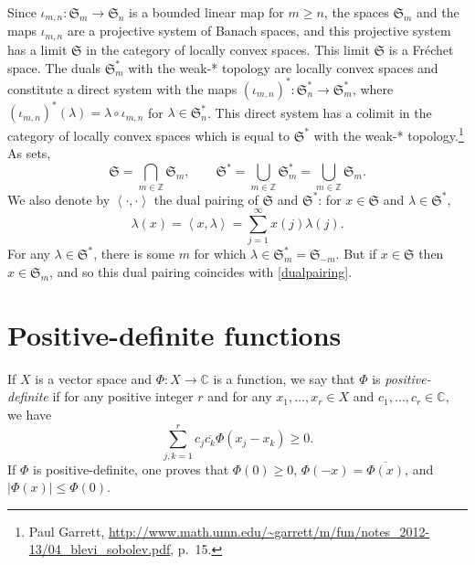 \documentclass{article}
\newcommand{\inner}[2]{\left\langle #1, #2 \right\rangle}
\theoremstyle{definition}
\theoremstyle{definition}
\begin{document}
Since $\iota_{m,n}:\mathfrak{S}_m \to \mathfrak{S}_n$ is a bounded linear map for $m \geq n$, 
the spaces $\mathfrak{S}_m$ and the maps $\iota_{m,n}$ are a projective system of Banach spaces, and this projective system has a limit
$\mathfrak{S}$
in the category of locally convex spaces. This limit $\mathfrak{S}$ is a Fr\'echet space.
The duals $\mathfrak{S}_m^*$ with the weak-* topology are locally convex spaces and constitute a direct system 
with the maps
$(\iota_{m,n})^*:\mathfrak{S}_n^* \to \mathfrak{S}_m^*$, where  
$(\iota_{m,n})^*(\lambda) = \lambda \circ \iota_{m,n}$ for $\lambda \in \mathfrak{S}_n^*$.
This direct system has a colimit in the category of locally convex spaces
which is  equal to $\mathfrak{S}^*$ with the weak-* topology.\footnote{Paul Garrett, \url{http://www.math.umn.edu/~garrett/m/fun/notes_2012-13/04_blevi_sobolev.pdf}, p.~15.} As sets,
\[
\mathfrak{S} = \bigcap_{m \in \mathbb{Z}} \mathfrak{S}_m, \qquad \mathfrak{S}^* = \bigcup_{m \in \mathbb{Z}} \mathfrak{S}_m^*
=\bigcup_{m \in \mathbb{Z}} \mathfrak{S}_m.
\]
We also denote by $\inner{\cdot}{\cdot}$ the dual pairing of $\mathfrak{S}$ and $\mathfrak{S}^*$: for $x \in \mathfrak{S}$ and
$\lambda \in \mathfrak{S}^*$,
\[
\lambda(x)=\inner{x}{\lambda} = \sum_{j=1}^\infty x(j) \lambda(j).
\]
For any $\lambda \in \mathfrak{S}^*$, there is some $m$ for which $\lambda \in \mathfrak{S}_m^*=\mathfrak{S}_{-m}$. 
But if $x \in \mathfrak{S}$ then $x \in \mathfrak{S}_m$, and so this dual pairing coincides with \eqref{dualpairing}.




\section{Positive-definite functions}
If $X$ is a vector space and $\Phi:X \to \mathbb{C}$ is a function, we say that $\Phi$ is {\em positive-definite} if for any positive integer $r$
and for any $x_1,\ldots,x_r \in X$ and $c_1,\ldots,c_r \in \mathbb{C}$, we have
\[
\sum_{j,k=1}^r c_j \overline{c_k} \Phi(x_j-x_k) \geq 0.
\]
If $\Phi$ is positive-definite, one proves that $\Phi(0) \geq 0$, $\Phi(-x)=\overline{\Phi(x)}$, and $|\Phi(x)| \leq \Phi(0)$. 
\end{document}
